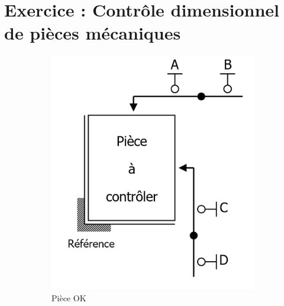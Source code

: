 \section{Exercice : Contrôle dimensionnel de pièces mécaniques}

\begin{figure}[ht]
    \centering
    \begin{subfigure}{0.49\textwidth}
        \centering
        \includegraphics[width=\textwidth, height=.25\textheight, keepaspectratio]{images/TP01_Ex02_palpeur01}
        \caption{Pièce OK}
    \end{subfigure}
    \begin{subfigure}{0.49\textwidth}
        \centering

\end{subfigure}
\end{figure}
